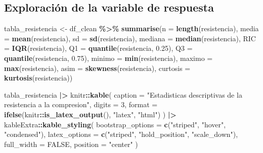 \documentclass[
]{book}
\newenvironment{Shaded}{\begin{snugshade}}{\end{snugshade}}
\newcommand{\AttributeTok}[1]{\textcolor[rgb]{0.13,0.29,0.53}{#1}}
\newcommand{\ConstantTok}[1]{\textcolor[rgb]{0.56,0.35,0.01}{#1}}
\newcommand{\DecValTok}[1]{\textcolor[rgb]{0.00,0.00,0.81}{#1}}
\newcommand{\FloatTok}[1]{\textcolor[rgb]{0.00,0.00,0.81}{#1}}
\newcommand{\FunctionTok}[1]{\textcolor[rgb]{0.13,0.29,0.53}{\textbf{#1}}}
\newcommand{\NormalTok}[1]{#1}
\newcommand{\OtherTok}[1]{\textcolor[rgb]{0.56,0.35,0.01}{#1}}
\newcommand{\SpecialCharTok}[1]{\textcolor[rgb]{0.81,0.36,0.00}{\textbf{#1}}}
\newcommand{\StringTok}[1]{\textcolor[rgb]{0.31,0.60,0.02}{#1}}
\begin{document}
\subsection{Exploración de la variable de respuesta}\label{exploraciuxf3n-de-la-variable-de-respuesta}

\begin{Shaded}
\begin{Highlighting}[]
\NormalTok{tabla\_resistencia }\OtherTok{\textless{}{-}}\NormalTok{ df\_clean }\SpecialCharTok{\%\textgreater{}\%} \FunctionTok{summarise}\NormalTok{(}\AttributeTok{n =} \FunctionTok{length}\NormalTok{(resistencia),}
                 \AttributeTok{media =} \FunctionTok{mean}\NormalTok{(resistencia),}
                 \AttributeTok{sd =} \FunctionTok{sd}\NormalTok{(resistencia),}
                 \AttributeTok{mediana =} \FunctionTok{median}\NormalTok{(resistencia),}
                 \AttributeTok{RIC =} \FunctionTok{IQR}\NormalTok{(resistencia),}
                 \AttributeTok{Q1 =} \FunctionTok{quantile}\NormalTok{(resistencia, }\FloatTok{0.25}\NormalTok{),}
                 \AttributeTok{Q3 =} \FunctionTok{quantile}\NormalTok{(resistencia, }\FloatTok{0.75}\NormalTok{),}
                 \AttributeTok{minimo =} \FunctionTok{min}\NormalTok{(resistencia),}
                 \AttributeTok{maximo =} \FunctionTok{max}\NormalTok{(resistencia),}
                 \AttributeTok{asim =} \FunctionTok{skewness}\NormalTok{(resistencia),}
                 \AttributeTok{curtosis =} \FunctionTok{kurtosis}\NormalTok{(resistencia))}

\NormalTok{tabla\_resistencia }\SpecialCharTok{|\textgreater{}}
\NormalTok{  knitr}\SpecialCharTok{::}\FunctionTok{kable}\NormalTok{(}
    \AttributeTok{caption =} \StringTok{"Estadisticas descriptivas de la resistencia a la compresion"}\NormalTok{,}
    \AttributeTok{digits =} \DecValTok{3}\NormalTok{,}
    \AttributeTok{format =} \FunctionTok{ifelse}\NormalTok{(knitr}\SpecialCharTok{::}\FunctionTok{is\_latex\_output}\NormalTok{(), }\StringTok{"latex"}\NormalTok{, }\StringTok{"html"}\NormalTok{)}
\NormalTok{  ) }\SpecialCharTok{|\textgreater{}}
\NormalTok{  kableExtra}\SpecialCharTok{::}\FunctionTok{kable\_styling}\NormalTok{(}
    \AttributeTok{bootstrap\_options =} \FunctionTok{c}\NormalTok{(}\StringTok{"striped"}\NormalTok{, }\StringTok{"hover"}\NormalTok{, }\StringTok{"condensed"}\NormalTok{),}
    \AttributeTok{latex\_options =} \FunctionTok{c}\NormalTok{(}\StringTok{"striped"}\NormalTok{, }\StringTok{"hold\_position"}\NormalTok{, }\StringTok{"scale\_down"}\NormalTok{),}
    \AttributeTok{full\_width =} \ConstantTok{FALSE}\NormalTok{,}
    \AttributeTok{position =} \StringTok{"center"}
\NormalTok{  )}
\end{Highlighting}
\end{Shaded}
\end{document}
